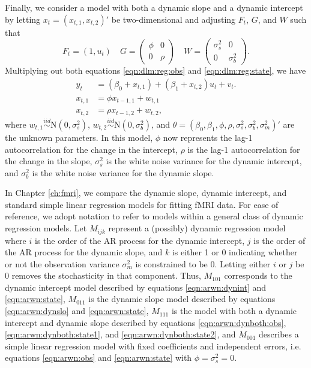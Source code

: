 Finally, we consider a model with both a dynamic slope and a dynamic intercept by letting $x_t = (x_{t,1},x_{t,2})'$ be two-dimensional and adjusting $F_t$, $G$, and $W$ such that
\[
F_t = (1, u_t) \quad G = \left(\begin{array}{cc} \phi & 0 \\ 0 & \rho \end{array}\right) \quad W = \left(\begin{array}{cc} \sigma^2_s & 0 \\ 0 & \sigma^2_b \end{array}\right).
\]
Multiplying out both equations \eqref{eqn:dlm:reg:obs} and \eqref{eqn:dlm:reg:state}, we have
\begin{align}
y_t &= (\beta_0 + x_{t,1}) + (\beta_1 + x_{t,2})u_t + v_t. \label{eqn:arwn:dynboth:obs} \\
x_{t,1} &= \phi x_{t-1,1} + w_{t,1} \label{eqn:arwn:dynboth:state1} \\
x_{t,2} &= \rho x_{t-1,2} + w_{t,2}, \label{eqn:arwn:dynboth:state2}
\end{align}
where $w_{t,1} \stackrel{iid}{\sim} \mbox{N}(0,\sigma^2_s)$, $w_{t,2} \stackrel{iid}{\sim} \mbox{N}(0,\sigma^2_b)$, and $\theta = (\beta_0,\beta_1,\phi,\rho,\sigma^2_s,\sigma^2_b,\sigma^2_m)'$ are the unknown parameters. In this model, $\phi$ now represents the lag-1 autocorrelation for the change in the intercept, $\rho$ is the lag-1 autocorrelation for the change in the slope, $\sigma^2_s$ is the white noise variance for the dynamic intercept, and $\sigma^2_b$ is the white noise variance for the dynamic slope.

In Chapter \ref{ch:fmri}, we compare the dynamic slope, dynamic intercept, and standard simple linear regression models for fitting fMRI data. For ease of reference, we adopt notation to refer to models within a general class of dynamic regression models. Let $M_{ijk}$ represent a (possibly) dynamic regression model where $i$ is the order of the AR process for the dynamic intercept, $j$ is the order of the AR process for the dynamic slope, and $k$ is either 1 or 0 indicating whether or not the observation variance $\sigma^2_m$ is constrained to be 0. Letting either $i$ or $j$ be 0 removes the stochasticity in that component. Thus, $M_{101}$ corresponds to the dynamic intercept model described by equations \ref{eqn:arwn:dynint} and \ref{eqn:arwn:state}, $M_{011}$ is the dynamic slope model described by equations \ref{eqn:arwn:dynslo} and \ref{eqn:arwn:state}, $M_{111}$ is the model with both a dynamic intercept and dynamic slope described by equations \ref{eqn:arwn:dynboth:obs}, \ref{eqn:arwn:dynboth:state1}, and \ref{eqn:arwn:dynboth:state2}, and $M_{001}$ describes a simple linear regression model with fixed coefficients and independent errors, i.e. equations \eqref{eqn:arwn:obs} and \eqref{eqn:arwn:state} with $\phi = \sigma^2_s = 0$.

